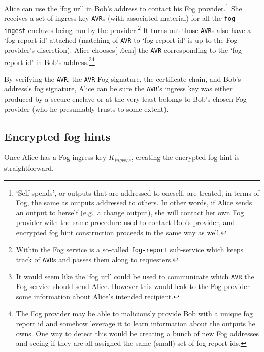 Alice can use the `fog url' in Bob's address to contact his Fog provider.\footnote{`Self-spends', or outputs that are addressed to oneself, are treated, in terms of Fog, the same as outputs addressed to others. In other words, if Alice sends an output to herself (e.g.\ a change output), she will contact her own Fog provider with the same procedure used to contact Bob's provider, and encrypted fog hint construction proceeds in the same way as well.} She receives a set of ingress key {\tt AVR}s (with associated material) for all the {\tt fog-ingest} enclaves being run by the provider.\footnote{Within the Fog service is a so-called {\tt fog-report} sub-service which keeps track of {\tt AVR}s and passes them along to requesters.} It turns out those {\tt AVR}s also have a `fog report id' attached (matching of {\tt AVR} to `fog report id' is up to the Fog provider's discretion). Alice chooses[-.6cm] the {\tt AVR} corresponding to the `fog report id' in Bob's address.\footnote{It would seem like the `fog url' could be used to communicate which {\tt AVR} the Fog service should send Alice. However this would leak to the Fog provider some information about Alice's intended recipient.}\footnote{The Fog provider may be able to maliciously provide Bob with a unique fog report id and somehow leverage it to learn information about the outputs he owns. One way to detect this would be creating a bunch of new Fog addresses and seeing if they are all assigned the same (small) set of fog report ids.}

By verifying the {\tt AVR}, the {\tt AVR} Fog signature, the certificate chain, and Bob's address's fog signature, Alice can be sure the {\tt AVR}'s ingress key was either produced by a secure enclave or at the very least belongs to Bob's chosen Fog provider (who he presumably trusts to some extent).


\subsection{Encrypted fog hints}
\label{subsec:fog-encrypted-fog-hints}

Once Alice has a Fog ingress key $K_{ingress}$, creating the encrypted fog hint is straightforward.

